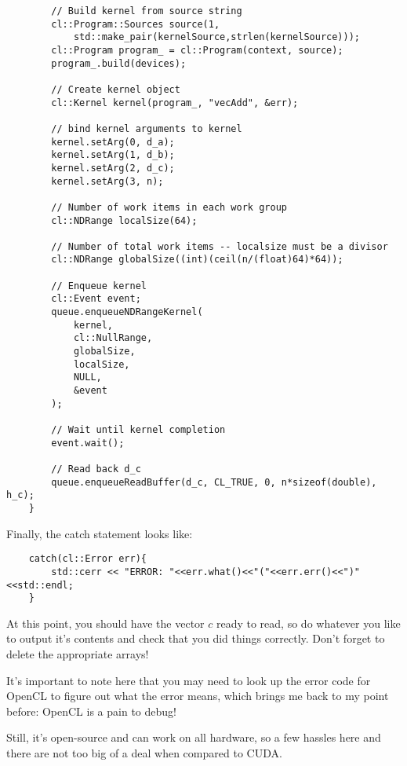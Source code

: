 \documentclass[11pt]{article}
\begin{document}
\begin{lstlisting}
        // Build kernel from source string
        cl::Program::Sources source(1,
            std::make_pair(kernelSource,strlen(kernelSource)));
        cl::Program program_ = cl::Program(context, source);
        program_.build(devices);

        // Create kernel object
        cl::Kernel kernel(program_, "vecAdd", &err);

        // bind kernel arguments to kernel
        kernel.setArg(0, d_a);
        kernel.setArg(1, d_b);
        kernel.setArg(2, d_c);
        kernel.setArg(3, n);

        // Number of work items in each work group
        cl::NDRange localSize(64);

        // Number of total work items -- localsize must be a divisor
        cl::NDRange globalSize((int)(ceil(n/(float)64)*64));

        // Enqueue kernel
        cl::Event event;
        queue.enqueueNDRangeKernel(
            kernel,
            cl::NullRange,
            globalSize,
            localSize,
            NULL,
            &event
        );

        // Wait until kernel completion
        event.wait();

        // Read back d_c
        queue.enqueueReadBuffer(d_c, CL_TRUE, 0, n*sizeof(double), h_c);
    }

\end{lstlisting}

Finally, the catch statement looks like:

\begin{lstlisting}
    catch(cl::Error err){
        std::cerr << "ERROR: "<<err.what()<<"("<<err.err()<<")"<<std::endl;
    }
\end{lstlisting}

At this point, you should have the vector $c$ ready to read, so do whatever you like to output it's contents and check that you did things correctly. Don't forget to delete the appropriate arrays!

It's important to note here that you may need to look up the error code for OpenCL to figure out what the error means, which brings me back to my point before: OpenCL is a pain to debug!

Still, it's open-source and can work on all hardware, so a few hassles here and there are not too big of a deal when compared to CUDA.

\newpage
\end{document}

